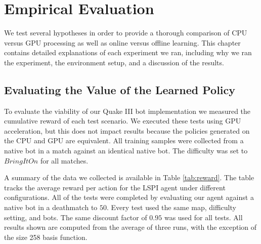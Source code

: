 \chapter{Empirical Evaluation}
\label{chap:evaluation}

We test several hypotheses in order to provide a thorough comparison of CPU versus GPU processing as well as online versus offline learning. This chapter contains detailed explanations of each experiment we ran, including why we ran the experiment, the environment setup, and a discussion of the results.

\section{Evaluating the Value of the Learned Policy}

To evaluate the viability of our Quake III bot implementation we measured the cumulative reward of each test scenario. We executed these tests using GPU acceleration, but this does not impact results because the policies generated on the CPU and GPU are equivalent. All training samples were collected from a native bot in a match against an identical native bot. The difficulty was set to $Bring It On$ for all matches.

A summary of the data we collected is available in Table \ref{tab:reward}. The table tracks the average reward per action for the LSPI agent under different configurations. All of the tests were completed by evaluating our agent against a native bot in a deathmatch to $50$. Every test used the same map, difficulty setting, and bots. The same discount factor of $0.95$ was used for all tests. All results shown are computed from the average of three runs, with the exception of the size 258 basis function.

